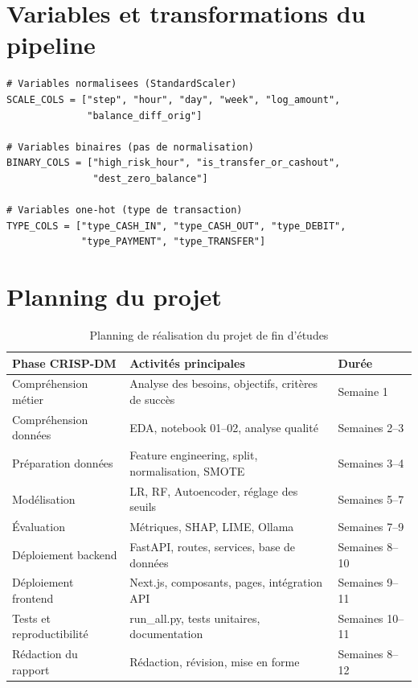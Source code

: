 \documentclass[12pt,a4paper,twoside]{report}
\begin{document}
\chapter{Variables et transformations du pipeline}

\begin{lstlisting}[label={lst:scale_cols}]
# Variables normalisees (StandardScaler)
SCALE_COLS = ["step", "hour", "day", "week", "log_amount",
              "balance_diff_orig"]

# Variables binaires (pas de normalisation)
BINARY_COLS = ["high_risk_hour", "is_transfer_or_cashout",
               "dest_zero_balance"]

# Variables one-hot (type de transaction)
TYPE_COLS = ["type_CASH_IN", "type_CASH_OUT", "type_DEBIT",
             "type_PAYMENT", "type_TRANSFER"]
\end{lstlisting}

\chapter{Planning du projet}

\begin{table}[H]
\centering
\caption{Planning de réalisation du projet de fin d'études}
\label{tab:planning}
\begin{tabular}{lll}
\toprule
\textbf{Phase CRISP-DM}  & \textbf{Activités principales}                      & \textbf{Durée} \\
\midrule
Compréhension métier     & Analyse des besoins, objectifs, critères de succès & Semaine 1 \\
Compréhension données    & EDA, notebook 01--02, analyse qualité               & Semaines 2--3 \\
Préparation données      & Feature engineering, split, normalisation, SMOTE   & Semaines 3--4 \\
Modélisation             & LR, RF, Autoencoder, réglage des seuils             & Semaines 5--7 \\
Évaluation               & Métriques, SHAP, LIME, Ollama                       & Semaines 7--9 \\
Déploiement backend      & FastAPI, routes, services, base de données          & Semaines 8--10 \\
Déploiement frontend     & Next.js, composants, pages, intégration API         & Semaines 9--11 \\
Tests et reproductibilité & run\_all.py, tests unitaires, documentation        & Semaines 10--11 \\
Rédaction du rapport     & Rédaction, révision, mise en forme                  & Semaines 8--12 \\
\bottomrule
\end{tabular}
\end{table}
\end{document}
